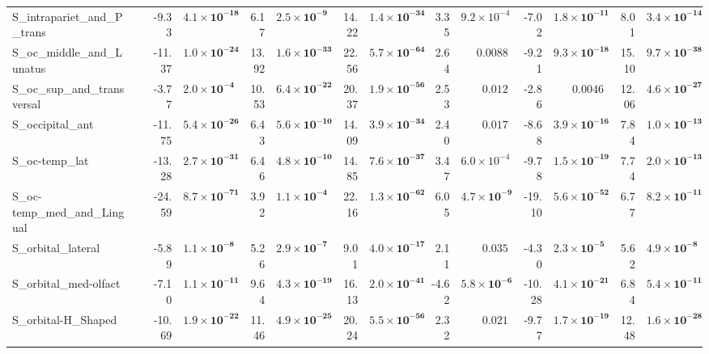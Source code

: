 {\begin{longtable}{llrrrrrrrrrrrr}
S\_intrapariet\_and\_P\_trans &  & -9.33 & $\mathbf{4.1{\times}10^{-18}}$ & 6.17 & $\mathbf{2.5{\times}10^{-9}}$ & 14.22 & $\mathbf{1.4{\times}10^{-34}}$ & 3.35 & $9.2{\times}10^{-4}$ & -7.02 & $\mathbf{1.8{\times}10^{-11}}$ & 8.01 & $\mathbf{3.4{\times}10^{-14}}$ \\
S\_oc\_middle\_and\_Lunatus &  & -11.37 & $\mathbf{1.0{\times}10^{-24}}$ & 13.92 & $\mathbf{1.6{\times}10^{-33}}$ & 22.56 & $\mathbf{5.7{\times}10^{-64}}$ & 2.64 & $0.0088$ & -9.21 & $\mathbf{9.3{\times}10^{-18}}$ & 15.10 & $\mathbf{9.7{\times}10^{-38}}$ \\
S\_oc\_sup\_and\_transversal &  & -3.77 & $\mathbf{2.0{\times}10^{-4}}$ & 10.53 & $\mathbf{6.4{\times}10^{-22}}$ & 20.37 & $\mathbf{1.9{\times}10^{-56}}$ & 2.53 & $0.012$ & -2.86 & $0.0046$ & 12.06 & $\mathbf{4.6{\times}10^{-27}}$ \\
S\_occipital\_ant &  & -11.75 & $\mathbf{5.4{\times}10^{-26}}$ & 6.43 & $\mathbf{5.6{\times}10^{-10}}$ & 14.09 & $\mathbf{3.9{\times}10^{-34}}$ & 2.40 & $0.017$ & -8.68 & $\mathbf{3.9{\times}10^{-16}}$ & 7.84 & $\mathbf{1.0{\times}10^{-13}}$ \\
S\_oc-temp\_lat &  & -13.28 & $\mathbf{2.7{\times}10^{-31}}$ & 6.46 & $\mathbf{4.8{\times}10^{-10}}$ & 14.85 & $\mathbf{7.6{\times}10^{-37}}$ & 3.47 & $6.0{\times}10^{-4}$ & -9.78 & $\mathbf{1.5{\times}10^{-19}}$ & 7.74 & $\mathbf{2.0{\times}10^{-13}}$ \\
S\_oc-temp\_med\_and\_Lingual &  & -24.59 & $\mathbf{8.7{\times}10^{-71}}$ & 3.92 & $\mathbf{1.1{\times}10^{-4}}$ & 22.16 & $\mathbf{1.3{\times}10^{-62}}$ & 6.05 & $\mathbf{4.7{\times}10^{-9}}$ & -19.10 & $\mathbf{5.6{\times}10^{-52}}$ & 6.77 & $\mathbf{8.2{\times}10^{-11}}$ \\
S\_orbital\_lateral &  & -5.89 & $\mathbf{1.1{\times}10^{-8}}$ & 5.26 & $\mathbf{2.9{\times}10^{-7}}$ & 9.01 & $\mathbf{4.0{\times}10^{-17}}$ & 2.11 & $0.035$ & -4.30 & $\mathbf{2.3{\times}10^{-5}}$ & 5.62 & $\mathbf{4.9{\times}10^{-8}}$ \\
S\_orbital\_med-olfact &  & -7.10 & $\mathbf{1.1{\times}10^{-11}}$ & 9.64 & $\mathbf{4.3{\times}10^{-19}}$ & 16.13 & $\mathbf{2.0{\times}10^{-41}}$ & -4.62 & $\mathbf{5.8{\times}10^{-6}}$ & -10.28 & $\mathbf{4.1{\times}10^{-21}}$ & 6.84 & $\mathbf{5.4{\times}10^{-11}}$ \\
S\_orbital-H\_Shaped &  & -10.69 & $\mathbf{1.9{\times}10^{-22}}$ & 11.46 & $\mathbf{4.9{\times}10^{-25}}$ & 20.24 & $\mathbf{5.5{\times}10^{-56}}$ & 2.32 & $0.021$ & -9.77 & $\mathbf{1.7{\times}10^{-19}}$ & 12.48 & $\mathbf{1.6{\times}10^{-28}}$ \\

\end{longtable}}

